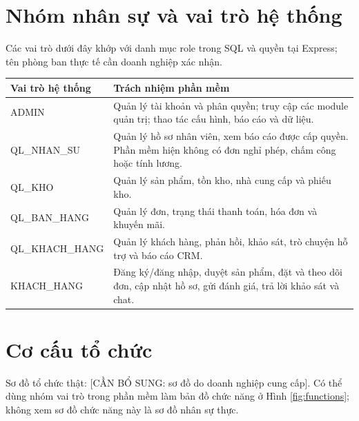 \section{Nhóm nhân sự và vai trò hệ thống}
Các vai trò dưới đây khớp với danh mục role trong SQL và quyền tại Express; tên phòng ban thực tế cần doanh nghiệp xác nhận.
\begin{longtable}{|p{}|p{}|}\hline
\textbf{Vai trò hệ thống}&\textbf{Trách nhiệm phần mềm}\\\hline
ADMIN&Quản lý tài khoản và phân quyền; truy cập các module quản trị; thao tác cấu hình, báo cáo và dữ liệu.\\\hline
QL\_NHAN\_SU&Quản lý hồ sơ nhân viên, xem báo cáo được cấp quyền. Phần mềm hiện không có đơn nghỉ phép, chấm công hoặc tính lương.\\\hline
QL\_KHO&Quản lý sản phẩm, tồn kho, nhà cung cấp và phiếu kho.\\\hline
QL\_BAN\_HANG&Quản lý đơn, trạng thái thanh toán, hóa đơn và khuyến mãi.\\\hline
QL\_KHACH\_HANG&Quản lý khách hàng, phản hồi, khảo sát, trò chuyện hỗ trợ và báo cáo CRM.\\\hline
KHACH\_HANG&Đăng ký/đăng nhập, duyệt sản phẩm, đặt và theo dõi đơn, cập nhật hồ sơ, gửi đánh giá, trả lời khảo sát và chat.\\\hline
\end{longtable}

\section{Cơ cấu tổ chức}
Sơ đồ tổ chức thật: [CẦN BỔ SUNG: sơ đồ do doanh nghiệp cung cấp]. Có thể dùng nhóm vai trò trong phần mềm làm bản đồ chức năng ở Hình \ref{fig:functions}; không xem sơ đồ chức năng này là sơ đồ nhân sự thực.
